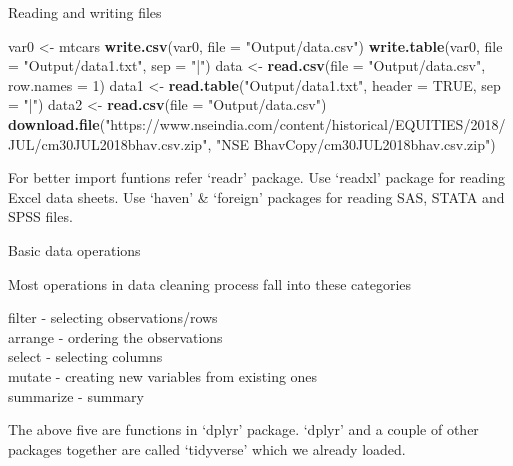 \documentclass[ignorenonframetext,]{beamer}
\newenvironment{Shaded}{\begin{snugshade}}{\end{snugshade}}
\newcommand{\DataTypeTok}[1]{\textcolor[rgb]{0.13,0.29,0.53}{#1}}
\newcommand{\DecValTok}[1]{\textcolor[rgb]{0.00,0.00,0.81}{#1}}
\newcommand{\KeywordTok}[1]{\textcolor[rgb]{0.13,0.29,0.53}{\textbf{#1}}}
\newcommand{\NormalTok}[1]{#1}
\newcommand{\OtherTok}[1]{\textcolor[rgb]{0.56,0.35,0.01}{#1}}
\newcommand{\StringTok}[1]{\textcolor[rgb]{0.31,0.60,0.02}{#1}}
\begin{document}
\begin{frame}[fragile]{Reading and writing files}
\protect\hypertarget{reading-and-writing-files}{}

\begin{Shaded}
\begin{Highlighting}[]
\NormalTok{var0 <-}\StringTok{ }\NormalTok{mtcars}
\KeywordTok{write.csv}\NormalTok{(var0, }\DataTypeTok{file =} \StringTok{"Output/data.csv"}\NormalTok{)}
\KeywordTok{write.table}\NormalTok{(var0, }\DataTypeTok{file =} \StringTok{"Output/data1.txt"}\NormalTok{, }\DataTypeTok{sep =} \StringTok{"|"}\NormalTok{)}
\NormalTok{data <-}\StringTok{ }\KeywordTok{read.csv}\NormalTok{(}\DataTypeTok{file =} \StringTok{"Output/data.csv"}\NormalTok{, }\DataTypeTok{row.names =} \DecValTok{1}\NormalTok{)}
\NormalTok{data1 <-}\StringTok{ }\KeywordTok{read.table}\NormalTok{(}\StringTok{"Output/data1.txt"}\NormalTok{, }
                    \DataTypeTok{header =} \OtherTok{TRUE}\NormalTok{, }\DataTypeTok{sep =} \StringTok{"|"}\NormalTok{)}
\NormalTok{data2 <-}\StringTok{ }\KeywordTok{read.csv}\NormalTok{(}\DataTypeTok{file =} \StringTok{"Output/data.csv"}\NormalTok{)}
\KeywordTok{download.file}\NormalTok{(}\StringTok{"https://www.nseindia.com/content/historical/EQUITIES/2018/JUL/cm30JUL2018bhav.csv.zip"}\NormalTok{,}
              \StringTok{"NSE BhavCopy/cm30JUL2018bhav.csv.zip"}\NormalTok{)}
\end{Highlighting}
\end{Shaded}

For better import funtions refer `readr' package. Use `readxl' package
for reading Excel data sheets. Use `haven' \& `foreign' packages for
reading SAS, STATA and SPSS files.

\end{frame}

\begin{frame}{Basic data operations}
\protect\hypertarget{basic-data-operations}{}

Most operations in data cleaning process fall into these categories

filter - selecting observations/rows\\
arrange - ordering the observations\\
select - selecting columns\\
mutate - creating new variables from existing ones\\
summarize - summary

The above five are functions in `dplyr' package. `dplyr' and a couple of
other packages together are called `tidyverse' which we already loaded.

\end{frame}
\end{document}
